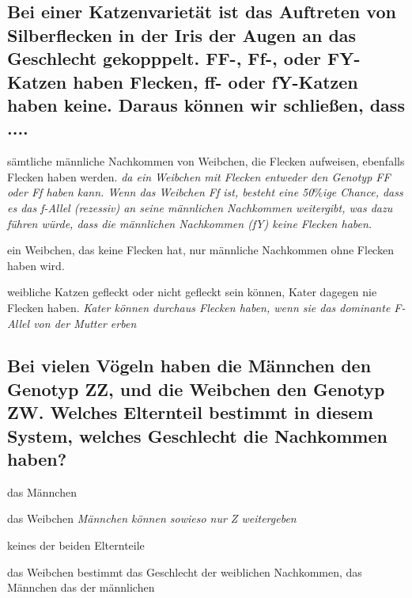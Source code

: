 \documentclass{article}
\newcommand{\cmark}{\ding{51}}%
\newcommand{\done}{\rlap{$\square$}{\raisebox{2pt}{\large\hspace{1pt}\cmark}}%
\hspace{-2.5pt}}
\begin{document}
\subsection*{Bei einer Katzenvarietät ist das Auftreten von Silberflecken in der Iris der
Augen an das Geschlecht gekopppelt. FF-, Ff-, oder FY-Katzen haben
Flecken, ff- oder fY-Katzen haben keine. Daraus können wir schließen,
dass ....}
\begin{todolist}%
\item sämtliche männliche Nachkommen von Weibchen, die Flecken
aufweisen, ebenfalls Flecken haben werden. \textit{\scriptsize da ein Weibchen mit Flecken entweder den Genotyp FF oder Ff haben kann. Wenn das Weibchen Ff ist, besteht eine 50$\%$ige Chance, dass es das f-Allel (rezessiv) an seine männlichen Nachkommen weitergibt, was dazu führen würde, dass die männlichen Nachkommen (fY) keine Flecken haben.}
\item[\done] ein Weibchen, das keine Flecken hat, nur männliche
Nachkommen ohne Flecken haben wird.
\item weibliche Katzen gefleckt oder nicht gefleckt sein können, Kater
dagegen nie Flecken haben. \textit{\scriptsize Kater können durchaus Flecken haben, wenn sie das dominante F-Allel von der Mutter erben}
\end{todolist}
\subsection*{Bei vielen Vögeln haben die Männchen den Genotyp ZZ, und die
Weibchen den Genotyp ZW. Welches Elternteil bestimmt in diesem
System, welches Geschlecht die Nachkommen haben?}
\begin{todolist}%
\item das Männchen
\item[\done] das Weibchen \textit{\scriptsize Männchen können sowieso nur Z weitergeben}
\item keines der beiden Elternteile
\item das Weibchen bestimmt das Geschlecht der weiblichen
Nachkommen, das Männchen das der männlichen
\end{todolist}
\end{document}
